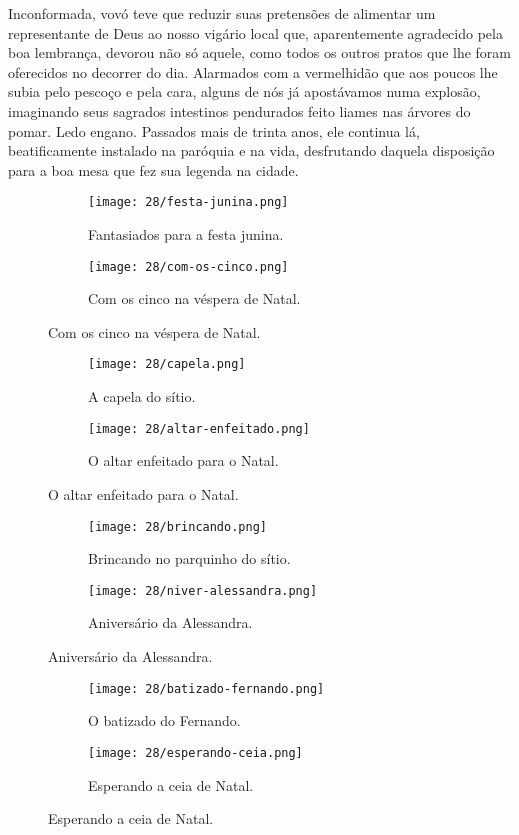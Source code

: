 Inconformada, vovó teve que reduzir suas pretensões de alimentar um representante de Deus ao nosso vigário local que, aparentemente agradecido pela boa lembrança, devorou não só aquele, como todos os outros pratos que lhe foram oferecidos no decorrer do dia.
Alarmados com a vermelhidão que aos poucos lhe subia pelo pescoço e pela cara, alguns de nós já apostávamos numa explosão, imaginando seus sagrados intestinos pendurados feito liames nas árvores do pomar.
Ledo engano.
Passados mais de trinta anos, ele continua lá, beatificamente instalado na paróquia e na vida, desfrutando daquela disposição para a boa mesa que fez sua legenda na cidade.
 

\begin{figure}[H]
\hfill
\centering
\begin{subfigure}[h]{0.45\linewidth}
\centering
\texttt{[image: 28/festa-junina.png]}
\caption{Fantasiados para a festa junina.}
\end{subfigure}
\hfill
\begin{subfigure}[h]{0.45\linewidth}
\centering
\texttt{[image: 28/com-os-cinco.png]}
\caption{Com os cinco na véspera de Natal.}
\end{subfigure}
\end{figure}

\begin{figure}\ContinuedFloat
\hfill
\centering
\begin{subfigure}[h]{0.4\linewidth}
\centering
\texttt{[image: 28/capela.png]}
\caption{A capela do sítio.}
\end{subfigure}
\hfill
\begin{subfigure}[h]{0.4\linewidth}
\centering
\texttt{[image: 28/altar-enfeitado.png]}
\caption{O altar enfeitado para o Natal.}
\end{subfigure}
\end{figure}

\begin{figure}\ContinuedFloat
\hfill
\centering
\begin{subfigure}[h]{0.4\linewidth}
\centering
\texttt{[image: 28/brincando.png]}
\caption{Brincando no parquinho do sítio.}
\end{subfigure}
\hfill
\begin{subfigure}[h]{0.4\linewidth}
\centering
\texttt{[image: 28/niver-alessandra.png]}
\caption{Aniversário da Alessandra.}
\end{subfigure}
\end{figure}

\begin{figure}\ContinuedFloat
\hfill
\centering
\begin{subfigure}[h]{0.4\linewidth}
\centering
\texttt{[image: 28/batizado-fernando.png]}
\caption{O batizado do Fernando.}
\end{subfigure}
\hfill
\begin{subfigure}[h]{0.4\linewidth}
\centering
\texttt{[image: 28/esperando-ceia.png]}
\caption{Esperando a ceia de Natal.}
\end{subfigure}
\end{figure}
